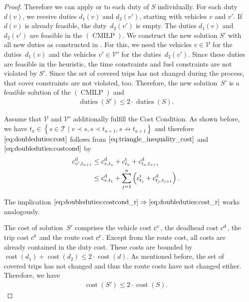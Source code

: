 \begin{proof}
Therefore we can apply  or  to each duty of $S$ individually. For each duty~$d(v)$, we receive duties $d_1(v)$ and $d_2(v')$, starting with vehicles $v$ and $v'$. If $d(v)$ is already feasible, the duty~$d_2(v')$ is empty. The duties $d_1(v)$ and $d_2(v')$ are feasible in the $(\operatorname{CMILP})$. We construct the new solution $S'$ with all new duties as constructed in . For this, we need the vehicles $v\in\mathcal{V}$ for the duties~$d_1(v)$ and the vehicles ${v'\in\mathcal{V}'}$ for the duties~$d_2(v')$. Since these duties are feasible in the heuristic, the time constraints and fuel constraints are not violated by $S'$. Since the set of covered trips has not changed during the process, that cover constraints are not violated, too. Therefore, the new solution~$S'$ is a feasible solution of the $(\operatorname{CMILP})$ and
\begin{align*}
	\operatorname{duties}\left(S'\right) \leq 2\cdot\operatorname{duties}\left(S\right).
\end{align*}

Assume that $\mathcal{V}$ and $\mathcal{V}'$ additionally fulfill the Cost Condition. As shown before, we have ${t_a\in\left\{s\in\mathcal{T}\mid v\prec s, s\prec t_{a+1}, s\not\to t_{a+1}\right\}}$ and therefore $\eqref{eq:doubleduties:cost}$ follows from $\eqref{eq:triangle_inequality_cost}$ and $\eqref{eq:doubleduties:costcond}$ by
\begin{align*}
	c^{\operatorname{d}}_{v',t_{a+1}} & \leq c^{\operatorname{d}}_{v,t_a} + c^{\operatorname{t}}_{t_a} + c^{\operatorname{d}}_{t_a,t_{a+1}} \\
	& \leq c^{\operatorname{d}}_{v,t_1} + \sum_{j=1}^a \left(c^{\operatorname{t}}_{t_j} + c^{\operatorname{d}}_{t_j,t_{j+1}}\right).
\end{align*}

The implication ${\eqref{eq:doubleduties:costcond_r}\Rightarrow\eqref{eq:doubleduties:cost_r}}$ works analogously.

The cost of solution~$S'$ comprises the vehicle cost $c^{\operatorname{v}}$, the deadhead cost $c^{\operatorname{d}}$, the trip cost $c^{\operatorname{t}}$ and the route cost $c^{\operatorname{r}}$. Except from the route cost, all costs are already contained in the duty cost. These costs are bounded by ${\operatorname{cost}\left(d_1\right) + \operatorname{cost}\left(d_2\right) \leq 2\cdot\operatorname{cost}\left(d\right)}$. As mentioned before, the set of covered trips has not changed and thus the route costs have not changed either. Therefore, we have
\begin{align*}
	\operatorname{cost}\left(S'\right) \leq 2\cdot\operatorname{cost}\left(S\right).
\end{align*}
%
\end{proof}

